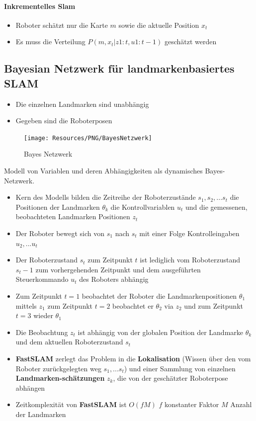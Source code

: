 \paragraph{Inkrementelles Slam}
\begin{itemize}
	\item Roboter schätzt nur die Karte $m$ sowie die aktuelle Position $x_t$
	\item Es muss die Verteilung $P(m, x_t | z1:t, u1:t-1)$ geschätzt werden
\end{itemize}

\subsection{Bayesian Netzwerk für landmarkenbasiertes SLAM}
\begin{itemize}
	\item Die einzelnen Landmarken sind unabhängig
	\item Gegeben sind die Roboterposen
\end{itemize}
\begin{figure}[H]
	\begin{center}
		\texttt{[image: Resources/PNG/BayesNetzwerk]}
		\caption{Bayes Netzwerk}
		\label{fig:PNG/BayesNetzwerk}
	\end{center}
\end{figure}
Modell von Variablen und deren Abhängigkeiten als dynamisches Bayes-Netzwerk.
\begin{itemize}
	\item Kern des Modells bilden die
		\subitem Zeitreihe der Roboterzustände $s_1, s_2, ... s_t$
		\subitem die Positionen der Landmarken $\theta_k$
		\subitem die Kontrollvariablen $u_t$
		\subitem und die gemessenen, beobachteten Landmarken Positionen $z_t$
	\item Der Roboter bewegt sich von $s_1$ nach $s_t$ mit einer Folge
		Kontrolleingaben $u_2, ... u_t$
	\item Der Roboterzustand $s_t$ zum Zeitpunkt $t$ ist lediglich vom
		Roboterzustand $s_t-1$ zum vorhergehenden Zeitpunkt und dem ausgeführten
		Steuerkommando $u_t$ des Roboters abhängig
	\item Zum Zeitpunkt $t = 1$ beobachtet der Roboter die Landmarkenpositionen
		$\theta_1$ mittels $z_1$ zum Zeitpunkt $t = 2$ beobachtet er $\theta_2$ via
		$z_2$ und zum Zeitpunkt $t = 3$ wieder $\theta_1$
	\item Die Beobachtung $z_t$ ist abhängig von der globalen Position der
		Landmarke $\theta_k$ und dem aktuellen Roboterzustand $s_t$
	\item \textbf{FastSLAM} zerlegt das Problem
		\subitem in die \textbf{Lokalisation} (Wissen über den vom Roboter
			zurückgelegten weg  $s_1, ... s_t$)
		\subitem und einer Sammlung von einzelnen \textbf{Landmarken-schätzungen}
			$z_k$, die von der geschätz\-ter Roboterpose abhängen
	\item Zeitkomplexität von \textbf{FastSLAM} ist $O(f M)$
		\subitem $f$ konstanter Faktor
		\subitem $M$ Anzahl der Landmarken
\end{itemize}
